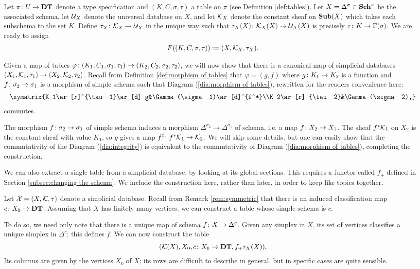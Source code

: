\documentclass{amsart}
\begin{document}
\begin{construction}\label{con:table as database}

Let $\pi\colon U\rightarrow{\bf DT}$ denote a type specification and $(K,C,\sigma,\tau)$ a table on $\pi$ (see Definition \ref{def:tables}).  Let $X=\Delta^\sigma\in{\bf Sch}^\pi$ be the associated schema, let $\mathcal{U}_X$ denote the universal database on $X$, and let $\mathcal{K}_X$ denote the constant sheaf on ${\bf Sub}(X)$ which takes each subschema to the set $K$.  Define $\tau_X\colon\mathcal{K}_X\rightarrow\mathcal{U}_X$ in the unique way such that $\tau_X(X)\colon\mathcal{K}_X(X)\rightarrow\mathcal{U}_X(X)$ is precisely $\tau\colon K\rightarrow\Gamma(\sigma)$.  We are ready to assign $$F((K,C,\sigma,\tau)):=(X,\mathcal{K}_X,\tau_X).$$

Given a map of tables $\varphi\colon(K_1,C_1,\sigma_1,\tau_1)\rightarrow(K_2,C_2,\sigma_2,\tau_2)$, we will now show that there is a canonical map of simplicial databases $(X_1,\mathcal{K}_1,\tau_1)\rightarrow(X_2,\mathcal{K}_2,\tau_2)$.  Recall from Definition \ref{def:morphism of tables} that $\varphi=(g,f)$ where $g\colon K_1\rightarrow K_2$ is a function and $f\colon\sigma_2\rightarrow\sigma_1$ is a morphism of simple schema such that Diagram (\ref{dia:morphism of tables}), rewritten for the readers convenience here: $$\xymatrix{K_1\ar[r]^{\tau_1}\ar[d]_g&\Gamma(\sigma_1)\ar[d]^{f^*}\\K_2\ar[r]_{\tau_2}&\Gamma(\sigma_2),}$$ commutes.

The morphism $f\colon\sigma_2\rightarrow\sigma_1$ of simple schema induces a morphism $\Delta^{\sigma_2}\to\Delta^{\sigma_1}$ of schema, i.e. a map $f\colon X_2\rightarrow X_1$.  The sheaf $f^*\mathcal{K}_1$ on $X_2$ is the constant sheaf with value $K_1$, so $g$ gives a map $f^\sharp\colon f^*\mathcal{K}_1\rightarrow\mathcal{K}_2$.  We will skip some details, but one can easily show that the commutativity of the Diagram (\ref{dia:integrity}) is equivalent to the commutativity of Diagram (\ref{dia:morphism of tables}), completing the construction.

\end{construction}

We can also extract a single table from a simplicial database, by looking at its global sections.  This requires a functor called $f_+$ defined in Section \ref{subsec:changing the schema}.  We include the construction here, rather than later, in order to keep like topics together.

\begin{construction}\label{con:database as table}

Let $\mathcal{X}=(X,\mathcal{K},\tau)$ denote a simplicial database.  Recall from Remark \ref{rem:symmetric} that there is an induced classification map $c\colon X_0\rightarrow{\bf DT}$.  Assuming that $X$ has finitely many vertices, we can construct a table whose simple schema is $c$.  

To do so, we need only note that there is a unique map of schema $f\colon X\rightarrow\Delta^c$.  Given any simplex in $X$, its set of vertices classifies a unique simplex in $\Delta^c$; this defines $f$.  We can now construct the table $$(\mathcal{K}(X),X_0,c\colon X_0\rightarrow{\bf DT},f_+\tau_X(X)).$$  Its columns are given by the vertices $X_0$ of $X$; its rows are difficult to describe in general, but in specific cases are quite sensible.

\end{construction}
\end{document}
